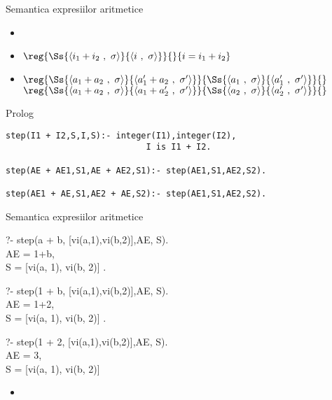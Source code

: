 \documentclass[xcolor=x11names,compress,10pt]{beamer}
\newcommand{\Conf}[2]{\ensuremath{\langle #1\ ,\ #2\rangle}}
\renewcommand{\to}{}
\begin{document}
  
\begin{frame}[fragile]{Semantica expresiilor aritmetice}
  \begin{itemize}
  \item {}	
   \item[] $\reg{\Ss{\Conf{i_1 + i_2}{\sigma}}{\Conf{i}{\sigma}}}{}{i = i_1 + i_2}$
  
  \item[] $\reg{\Ss{\Conf{a_1 + a_2}{\sigma}}{\Conf{a_1' + a_2}{\sigma'}}}{\Ss{\Conf{a_1}{\sigma}}{\Conf{a_1'}{\sigma'}}}{}$\hfill$\reg{\Ss{\Conf{a_1 + a_2}{\sigma}}\to{\Conf{a_1 + a_2'}{\sigma'}}}{\Ss{\Conf{a_2}{\sigma}}\to {\Conf{a_2'}{\sigma'}}}{}$
  \end{itemize}
  
 \begin{block}{Prolog} 
\begin{verbatim}
step(I1 + I2,S,I,S):- integer(I1),integer(I2), 
                            I is I1 + I2.
                            
step(AE + AE1,S1,AE + AE2,S1):- step(AE1,S1,AE2,S2).

step(AE1 + AE,S1,AE2 + AE,S2):- step(AE1,S1,AE2,S2).
\end{verbatim}
\end{block}
\end{frame}



\begin{frame}{Semantica expresiilor aritmetice}
\begin{example}

?- step(a + b, [vi(a,1),vi(b,2)],AE, S).\\
AE = 1+b,\\
S = [vi(a, 1), vi(b, 2)] .\\

\medskip

?- step(1 + b, [vi(a,1),vi(b,2)],AE, S).\\
AE = 1+2,\\
S = [vi(a, 1), vi(b, 2)] .\\

\medskip

?- step(1 + 2, [vi(a,1),vi(b,2)],AE, S).\\
AE = 3,\\
S = [vi(a, 1), vi(b, 2)] 
\end{example}

\pause
  \begin{itemize}
   \item {}
  \end{itemize}
\end{frame}
\end{document}
